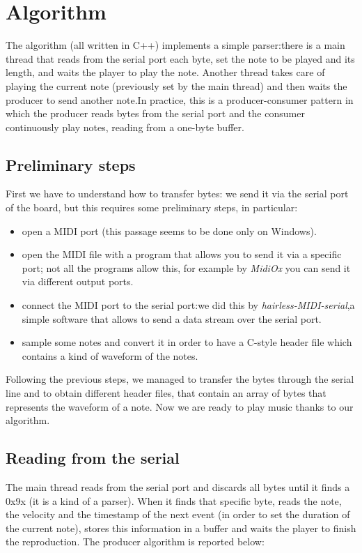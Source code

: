 \documentclass[12pt]{article}
\begin{document}
\section{Algorithm} \label{sec:algorithm}
The algorithm (all written in C++) implements a simple parser:there is a main thread that reads from the serial port each byte, set the note to be played and its length, and waits the player to play the note. Another thread takes care of playing the current note (previously set by the main thread) and then waits the producer to send another note.In practice, this is a producer-consumer pattern in which the producer reads bytes from the serial port and the consumer continuously play notes, reading from a one-byte buffer.

\subsection{Preliminary steps}
First we have to understand how to transfer bytes: we send it via the serial port of the board, but this requires some preliminary steps, in particular:
\begin{itemize}
	\item open a MIDI port (this passage seems to be done only on Windows).
	\item open the MIDI file with a program that allows you to send it via a specific port; not all the programs allow this, for example by \textit{MidiOx}  you can send it via different output ports.
	\item connect the MIDI port to the serial port:we did this by \textit{hairless-MIDI-serial},a simple software that allows to send a data stream over the serial port.
	\item sample some notes and convert it in order to have a C-style header file which contains a kind of waveform of the notes.
\end{itemize}
Following the previous steps, we managed to transfer the bytes through the serial line and to obtain different header files, that contain an array of bytes that represents the waveform of a note. Now we are ready to play music thanks to our algorithm.

\subsection{Reading from the serial}
The main thread reads from the serial port and discards all bytes until it finds a 0x9x (it is a kind of a parser). When it finds that specific byte, reads the note, the velocity and the timestamp of the next event (in order to set the duration of the current note), stores this information in a buffer and waits the player to finish the reproduction. The producer algorithm is reported below:
\end{document}
